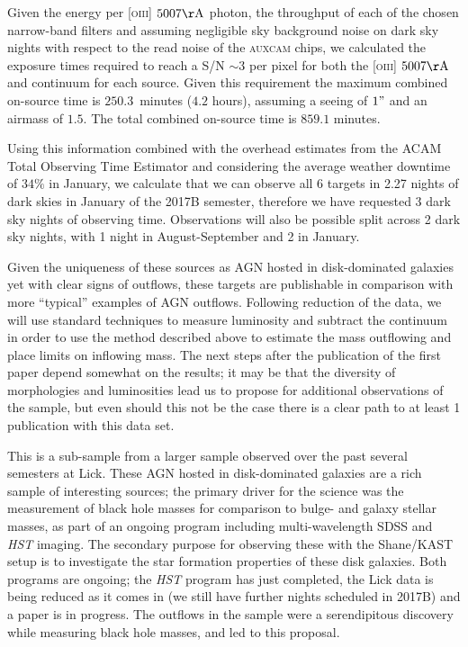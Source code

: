 \documentclass[12pt]{article}
\begin{document}
Given the energy per \textsc{[oiii]} $5007\rm{\AA}$ photon, the throughput of each of the chosen narrow-band filters and assuming negligible sky background noise on dark sky nights  with respect to the read noise of the \textsc{auxcam} chips, we calculated the exposure times required to reach a S/N $\sim 3$ per pixel for both the \textsc{[oiii]} $5007\rm{\AA}$ and continuum for each source. Given this requirement the maximum combined on-source time is $250.3$~minutes ($4.2$ hours), assuming a seeing of $1"$ and an airmass of $1.5$. The total combined on-source time is $859.1$ minutes.  
\vspace{0.25em}

Using this information combined with the overhead estimates from the ACAM Total Observing Time Estimator and considering the average weather downtime of $34\%$ in January, we calculate that we can observe all 6 targets in 2.27 nights of dark skies in January of the 2017B semester, therefore we have requested 3 dark sky nights of observing time. Observations will also be possible split across 2 dark sky nights, with 1 night in August-September and 2 in January.
\vspace{0.25em}


\vspace{0.25em}
Given the uniqueness of these sources as AGN hosted in disk-dominated galaxies yet with clear signs of outflows, these targets are publishable in comparison with more ``typical'' examples of AGN outflows. Following reduction of the data, we will use standard techniques to measure luminosity and subtract the continuum in order to use the method described above to estimate the mass outflowing and place limits on inflowing mass. The next steps after the publication of the first paper depend somewhat on the results; it may be that the diversity of morphologies and luminosities lead us to propose for additional observations of the sample, but even should this not be the case there is a clear path to at least 1 publication with this data set.
\vspace{0.25em}


\vspace{0.25em}
This is a sub-sample from a larger sample observed over the past several semesters at Lick. These AGN hosted in disk-dominated galaxies are a rich sample of interesting sources; the primary driver for the science was the measurement of black hole masses for comparison to bulge- and galaxy stellar masses, as part of an ongoing program including multi-wavelength SDSS and \emph{HST} imaging. The secondary purpose for observing these with the Shane/KAST setup is to investigate the star formation properties of these disk galaxies. Both programs are ongoing; the \emph{HST} program has just completed, the Lick data is being reduced as it comes in (we still have further nights scheduled in 2017B) and a paper is in progress. The outflows in the sample were a serendipitous discovery while measuring black hole masses, and led to this proposal. 
\vspace{0.25em}
\end{document}

